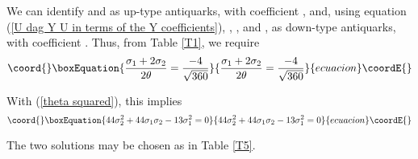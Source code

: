 \documentclass[a4paper,12pt,oneside]{article}
\begin{document}
We can identify \coordHE{} and \coordHE{} as up-type antiquarks,
with \coordHE{} coefficient \coordHE{}, and,
using equation (\ref{U dag Y U in terms of the Y coefficients}),
\coordHE{}, \coordHE{}, and \coordHE{}, as down-type antiquarks, with \coordHE{} coefficient
\coordHE{}.  Thus, from Table \ref{T1},
we require
\begin{equation}\coord{}\boxEquation{\label{condition on the sigmas for the antiquarks}
\frac{\sigma_1+2\sigma_2}{2\theta}=\frac{-4}{\sqrt{360}}
}{\frac{\sigma_1+2\sigma_2}{2\theta}=\frac{-4}{\sqrt{360}}
}{ecuacion}\coordE{}\end{equation}

With (\ref{theta squared}), this implies
\begin{equation}\coord{}\boxEquation{\label{quadratic equation for sigma 2}
44\sigma_2^2+44\sigma_1\sigma_2-13\sigma_1^2=0
}{44\sigma_2^2+44\sigma_1\sigma_2-13\sigma_1^2=0
}{ecuacion}\coordE{}\end{equation}

The two solutions may be chosen as in Table \ref{T5}.
\end{document}
